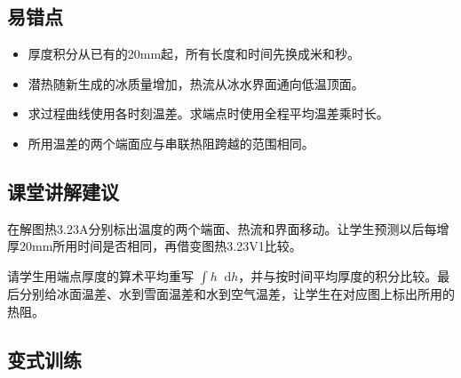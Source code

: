 \documentclass[UTF8,fontset=fandol,a4paper,11pt]{ctexart}
\newcommand{\dd}{\mathop{}\!\mathrm{d}}
\begin{document}
\subsection*{易错点}

\begin{itemize}
\item 厚度积分从已有的20mm起，所有长度和时间先换成米和秒。
\item 潜热随新生成的冰质量增加，热流从冰水界面通向低温顶面。
\item 求过程曲线使用各时刻温差。求端点时使用全程平均温差乘时长。
\item 所用温差的两个端面应与串联热阻跨越的范围相同。
\end{itemize}



\subsection*{课堂讲解建议}

在解图热3.23A分别标出温度的两个端面、热流和界面移动。让学生预测以后每增厚20mm所用时间是否相同，再借变图热3.23V1比较。

请学生用端点厚度的算术平均重写 $\int h\dd h$，并与按时间平均厚度的积分比较。最后分别给冰面温差、水到雪面温差和水到空气温差，让学生在对应图上标出所用的热阻。



\subsection*{变式训练}
\end{document}
